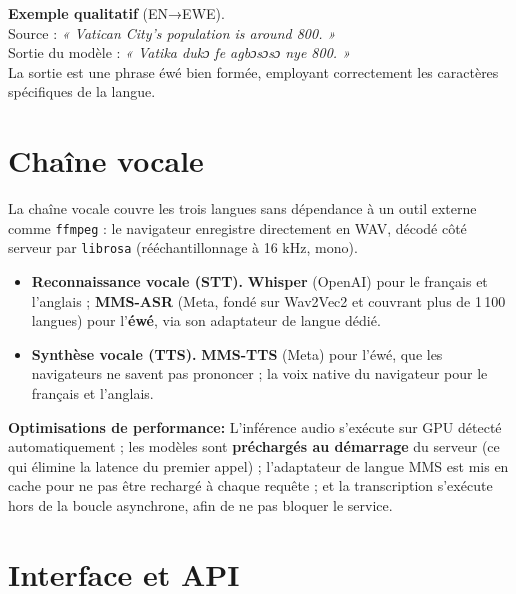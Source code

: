 \documentclass[11pt,a4paper]{article}
\begin{document}
\begin{keybox}
\textbf{Exemple qualitatif} (EN→EWE).\\
Source : \textit{« Vatican City's population is around 800. »}\\
Sortie du modèle : \textit{« Vatika dukɔ ƒe agbɔsɔsɔ nye 800. »}\\
La sortie est une phrase éwé bien formée, employant correctement les caractères
spécifiques de la langue.
\end{keybox}

\section{Chaîne vocale}

La chaîne vocale couvre les trois langues sans dépendance à un outil externe comme
\texttt{ffmpeg} : le navigateur enregistre directement en WAV, décodé côté serveur par
\texttt{librosa} (rééchantillonnage à 16 kHz, mono).

\begin{itemize}[leftmargin=1.5em,itemsep=3pt]
  \item \textbf{Reconnaissance vocale (STT).} \textbf{Whisper} (OpenAI) pour le français
        et l'anglais ; \textbf{MMS-ASR} (Meta, fondé sur Wav2Vec2 et couvrant plus de
        1\,100 langues) pour l'\textbf{éwé}, via son adaptateur de langue dédié.
  \item \textbf{Synthèse vocale (TTS).} \textbf{MMS-TTS} (Meta) pour l'éwé, que les
        navigateurs ne savent pas prononcer ; la voix native du navigateur pour le
        français et l'anglais.
\end{itemize}

\begin{infobox}
\textbf{Optimisations de performance:} L'inférence audio s'exécute sur GPU détecté
automatiquement ; les modèles sont \textbf{préchargés au démarrage} du serveur (ce qui
élimine la latence du premier appel) ; l'adaptateur de langue MMS est mis en cache pour
ne pas être rechargé à chaque requête ; et la transcription s'exécute hors de la boucle
asynchrone, afin de ne pas bloquer le service.
\end{infobox}

\section{Interface et API}
\end{document}
